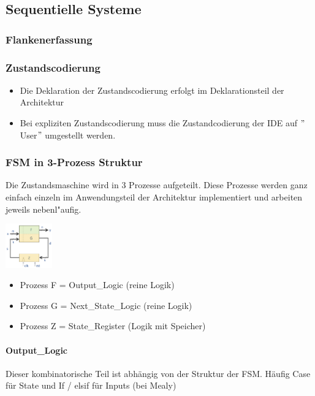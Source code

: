 	
			\begin{multicols}{2}
			\subsection{Sequentielle Systeme}
		\subsubsection{Flankenerfassung}
				
			
		\subsubsection{Zustandscodierung}
		
				\begin{itemize}
					\item Die Deklaration der Zustandscodierung erfolgt im Deklarationsteil 						der Architektur
					\item Bei expliziten Zustandscodierung muss die Zustandcodierung der 
						IDE auf $"$User$"$ umgestellt werden.
				\end{itemize}
				\columnbreak
				
			\end{multicols}
			\begin{multicols}{2}
		\subsubsection{FSM in 3-Prozess Struktur}
			Die Zustandsmaschine wird in 3 Prozesse aufgeteilt. Diese Prozesse werden ganz 
			einfach einzeln im Anwendungsteil der Architektur implementiert und arbeiten 
			jeweils nebenl"aufig.
			
				\begin{center}
					\includegraphics[width=0.15\textwidth]{pics/fsmprocesslogic}
				\end{center}
				\begin{itemize}
				\itemsep0em
					\item Prozess F = Output\_Logic (reine Logik)
					\item Prozess G = Next\_State\_Logic (reine Logik)
					\item Prozess Z = State\_Register (Logik mit Speicher)
				\end{itemize}
				\paragraph{Output\_Logic}
					Dieser kombinatorische Teil ist abhängig von der Struktur der FSM. Häufig Case für State und If / elsif für Inputs (bei Mealy)
					
				\end{multicols}
